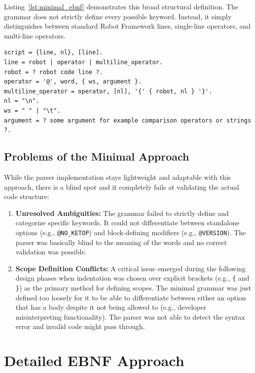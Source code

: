 Listing~\ref{lst:minimal_ebnf} demonstrates this broad structural definition. The grammar does not strictly define every possible keyword. Instead, it simply distinguishes between standard Robot Framework lines, single-line operators, and multi-line operators. 


\begin{lstlisting}[caption={The Minimal EBNF grammar}, label={lst:minimal_ebnf}, float=htbp]
script = {line, nl}, [line].
line = robot | operator | multiline_operator.
robot = ? robot code line ?.
operator = '@', word, { ws, argument }.
multiline_operator = operator, [nl], '{' { robot, nl } '}'.
nl = "\n".
ws = " " | "\t".
argument = ? some argument for example comparison operators or strings ?.
\end{lstlisting}

\subsection{Problems of the Minimal Approach}

While the parser implementation stays lightweight and adaptable with this approach, there is a blind spot and it completely fails at validating the actual code structure:
\begin{enumerate}
    \item \textbf{Unresolved Ambiguities:} The grammar failed to strictly define and categorize specific keywords. It could not differentiate between standalone options (e.g., \texttt{@NO\_KETOP}) and block-defining modifiers (e.g., \texttt{@VERSION}). The parser was basically blind to the meaning of the words and no correct validation was possible.
    \item \textbf{Scope Definition Conflicts:} A critical issue emerged during the following design phases when indentation was chosen over explicit brackets (e.g., \texttt{\{} and \texttt{\}}) as the primary method for defining scopes. The minimal grammar was just defined too loosely for it to be able to differentiate between either an option that has a body despite it not being allowed to (e.g., developer misinterpreting functionality). The parser was not able to detect the syntax error and invalid code might pass through.
\end{enumerate}


\section{Detailed EBNF Approach}

